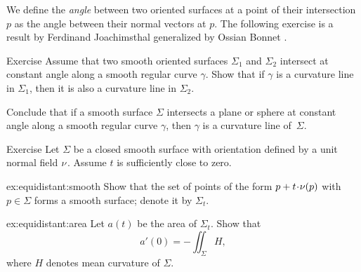 We define the \emph{angle} between two oriented surfaces at a point of their intersection $p$ as the angle between their normal vectors at $p$.
The following exercise is a result by Ferdinand Joachimsthal \cite{joachimsthal} generalized by Ossian Bonnet \cite{bonnet}.

\begin{thm}{Exercise}\label{ex:shape-curvature-line}
Assume that two smooth oriented surfaces $\Sigma_1$ and $\Sigma_2$ intersect at constant angle along a smooth regular curve $\gamma$.
Show that if $\gamma$ is a curvature line in $\Sigma_1$, then it is also a curvature line in $\Sigma_2$.

Conclude that if a smooth surface $\Sigma$ intersects a plane or sphere at constant angle along a smooth regular curve $\gamma$,
then $\gamma$ is a curvature line of~$\Sigma$.
\end{thm}

\begin{thm}{Exercise}\label{ex:equidistant}
Let $\Sigma$ be a closed smooth surface with orientation defined by a unit normal field $\nu$.
Assume $t$ is sufficiently close to zero.

\begin{subthm}{ex:equidistant:smooth}
Show that the set of points of the form $p+t\cdot \Norm(p)$ with $p\in\Sigma$ forms a smooth surface; denote it by $\Sigma_t$.
\end{subthm}

\begin{subthm}{ex:equidistant:area}
Let $a(t)$ be the area of $\Sigma_t$.
Show that 
\[a'(0)=-\iint_\Sigma H,\]
where $H$ denotes mean curvature of $\Sigma$.
\end{subthm}



\end{thm}

